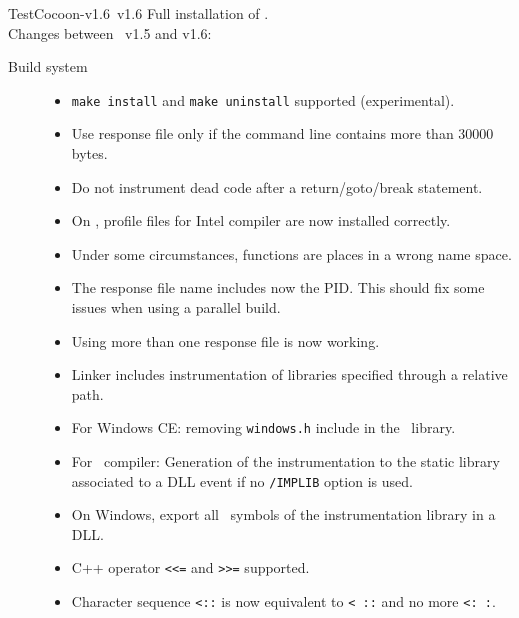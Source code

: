 \begin{TestCocoonDownload}
\begin{TestCocoonDownloadLink}
\end{TestCocoonDownloadLink}
\begin{ReleaseNote}{TestCocoon-v1.6}{\TestCocoon\ v1.6}
Full installation of \TestCocoon.\\
Changes between \TestCocoon\ v1.5 and v1.6:
\begin{description}
\item[Build system]
  \begin{itemize}
    \item \NewFeature \verb$make install$ and \verb$make uninstall$ supported (experimental).
  \end{itemize}
\item[\CoverageScanner]
  \begin{itemize}
    \item         Use response file only if the command line contains more than 30000 bytes.
    \item \NewFeature Do not instrument dead code after a return/goto/break statement.
    \item \BugFix On \Linux, profile files for Intel compiler are now installed correctly.
    \item \BugFix Under some circumstances, functions are places in a wrong name space.
    \item \BugFix The response file name includes now the PID. This should fix some issues when using a parallel build.
    \item \BugFix Using more than one response file is now working.
    \item \BugFix Linker includes instrumentation of libraries specified through a relative path.
    \item \BugFix For Windows CE: removing \verb$windows.h$ include in the \CoverageScanner\ library.
    \item \BugFix For \VisualStudio\ compiler: Generation of the instrumentation to the static library associated to a DLL event if no \verb$/IMPLIB$ option is used.
    \item \BugFix On Windows, export all \CoverageScanner\ symbols of the instrumentation library in a DLL.
    \item \BugFix C++ operator \verb$<<=$ and \verb$>>=$ supported.
    \item \BugFix Character sequence \verb$<::$ is now equivalent to \verb$< ::$ and no more \verb$<: :$.

\end{itemize}
\end{description}
\end{ReleaseNote}
\end{TestCocoonDownload}
